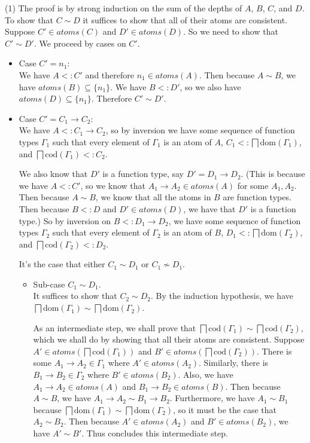 \documentclass{article}
\newcommand{\ATOMS}[1]{\mathit{atoms}(#1)}
\begin{document}
(1) The proof is by strong induction on the sum of the depths of $A$,
$B$, $C$, and $D$. To show that $C \sim D$ it suffices to show that
all of their atoms are consistent. Suppose $C' \in \ATOMS{C}$
and $D'\in\ATOMS{D}$. So we need to show that $C' \sim D'$.
We proceed by cases on $C'$.
\begin{itemize}
\item Case $C'=n_1$:\\
  We have $A <: C'$ and therefore $n_1 \in \ATOMS{A}$.
  Then because $A \sim B$, we have $\ATOMS{B} \subseteq \{n_1\}$.
  We have $B <: D'$, so we also have $\ATOMS{D} \subseteq \{n_1\}$.
  Therefore $C' \sim D'$.
  
\item Case $C'=C_1\to C_2$:\\
  We have $A <: C_1 \to C_2$, so by inversion we have
  some sequence of function types $\Gamma_1$ such that
  every element of $\Gamma_1$ is an atom of $A$,
  $C_1 <: \bigsqcap \mathrm{dom}(\Gamma_1)$,
  and $\bigsqcap \mathrm{cod}(\Gamma_1) <: C_2$.

  We also know that $D'$ is a function type, say $D'=D_1 \to D_2$.
  (This is because we have $A <: C'$, so we know that $A_1\to A_2 \in
  \ATOMS{A}$ for some $A_1,A_2$. Then because $A \sim B$, we know that
  all the atoms in $B$ are function types.  Then because $B <: D$ and
  $D' \in \ATOMS{D}$, we have that $D'$ is a function type.)
  So by inversion on $B <: D_1 \to D_2$, we have
  some sequence of function types $\Gamma_2$ such that
  every element of $\Gamma_2$ is an atom of $B$,
  $D_1 <: \bigsqcap \mathrm{dom}(\Gamma_2)$,
  and $\bigsqcap \mathrm{cod}(\Gamma_2) <: D_2$.

  It's the case that either $C_1 \sim D_1$ or $C_1 \not\sim D_1$.
  \begin{itemize}
  \item Sub-case $C_1 \sim D_1$.\\
    It suffices to show that $C_2 \sim D_2$.
    By the induction hypothesis, we have
    $\bigsqcap \mathrm{dom}(\Gamma_1) \sim \bigsqcap \mathrm{dom}(\Gamma_2)$.

    As an intermediate step, we shall prove that
    $\bigsqcap \mathrm{cod}(\Gamma_1) \sim \bigsqcap \mathrm{cod}(\Gamma_2)$,
    which we shall do by showing that all their atoms are consistent.
    Suppose $A' \in \ATOMS{\bigsqcap \mathrm{cod}(\Gamma_1)}$
    and $B' \in \ATOMS{\bigsqcap \mathrm{cod}(\Gamma_2)}$.
    There is some $A_1\to A_2 \in \Gamma_1$ where $A' \in \ATOMS{A_2}$.
    Similarly, there is $B_1 \to B_2 \in \Gamma_2$ where $B' \in \ATOMS{B_2}$.
    Also, we have $A_1 \to A_2 \in \ATOMS{A}$ and $B_1 \to B_2 \in \ATOMS{B}$.
    Then because $A \sim B$, we have $A_1 \to A_2 \sim B_1 \to B_2$.
    Furthermore, we have $A_1 \sim B_1$ because
    $\bigsqcap \mathrm{dom}(\Gamma_1) \sim \bigsqcap \mathrm{dom}(\Gamma_2)$,
    so it must be the case that $A_2 \sim B_2$.
    Then because $A' \in \ATOMS{A_2}$ and $B' \in \ATOMS{B_2}$, we
    have $A' \sim B'$. Thus concludes this intermediate step.


\end{itemize}
\end{itemize}
\end{document}
